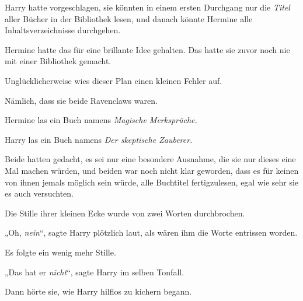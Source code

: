 Harry hatte vorgeschlagen, sie könnten in einem ersten Durchgang nur die \emph{Titel} aller Bücher in der Bibliothek lesen, und danach könnte Hermine alle Inhaltsverzeichnisse durchgehen.

Hermine hatte das für eine brillante Idee gehalten. Das hatte sie zuvor noch nie mit einer Bibliothek gemacht.

Unglücklicherweise wies dieser Plan einen kleinen Fehler auf.

Nämlich, dass sie beide Ravenclaws waren.

Hermine las ein Buch namens \emph{Magische Merksprüche.}

Harry las ein Buch namens \emph{Der skeptische Zauberer.}

Beide hatten gedacht, es sei nur eine besondere Ausnahme, die sie nur dieses eine Mal machen würden, und beiden war noch nicht klar geworden, dass es für keinen von ihnen jemals möglich sein würde, alle Buchtitel fertigzulesen, egal wie sehr sie es auch versuchten.

Die Stille ihrer kleinen Ecke wurde von zwei Worten durchbrochen.

„Oh, \emph{nein}“, sagte Harry plötzlich laut, als wären ihm die Worte entrissen worden.

Es folgte ein wenig mehr Stille.

„Das hat er \emph{nicht}“, sagte Harry im selben Tonfall.

Dann hörte sie, wie Harry hilflos zu kichern begann.

